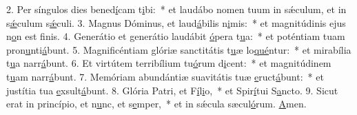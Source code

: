 2. Per síngulos dies bened\uline{í}cam t\uline{i}bi:~* et laudábo nomen tuum in sǽculum, et in s\uline{ǽ}culum s\uline{ǽ}culi.
3. Magnus Dóminus, et laud\uline{á}bilis n\uline{i}mis:~* et magnitúdinis ejus n\uline{o}n est f\uline{i}nis.
4. Generátio et generátio laudábit \uline{ó}pera t\uline{u}a:~* et poténtiam tuam pron\uline{u}nti\uline{á}bunt.
5. Magnificéntiam glóriæ sanctitátis t\uline{u}æ lo\uline{qué}ntur:~* et mirabília t\uline{u}a narr\uline{á}bunt.
6. Et virtútem terribílium tu\uline{ó}rum d\uline{i}cent:~* et magnitúdinem t\uline{u}am narr\uline{á}bunt.
7. Memóriam abundántiæ suavitátis tuæ \uline{e}ruct\uline{á}bunt:~* et justítia tua \uline{e}xsult\uline{á}bunt.
8. Glória Patri, et F\uline{í}l\uline{i}o,~* et Spir\uline{í}tui S\uline{a}ncto.
9. Sicut erat in princípio, et n\uline{u}nc, et s\uline{e}mper,~* et in sǽcula sæcul\uline{ó}rum. \uline{A}men.
